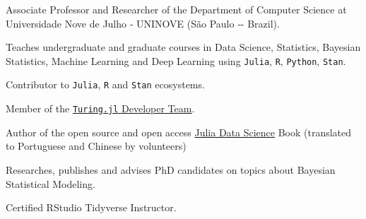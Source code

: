 \vspace{0.25cm}

\begin{cvitems}

	\item Associate Professor and Researcher of the Department of Computer Science at Universidade Nove de Julho ‑
	UNINOVE (São Paulo ‑- Brazil).
	\item Teaches undergraduate and graduate courses in Data Science, Statistics, Bayesian Statistics,
	Machine Learning and Deep Learning using \texttt{Julia}, \texttt{R}, \texttt{Python}, \texttt{Stan}.
	\item Contributor to \texttt{Julia}, \texttt{R} and \texttt{Stan} ecosystems.
	\item Member of the \href{https://turing.ml/dev/team/}{\texttt{Turing.jl} Developer Team}.
	\item Author of the open source and open access \href{https://juliadatascience.io}{Julia Data Science} Book (translated to Portuguese and Chinese by volunteers)
	\item Researches, publishes and advises PhD candidates on topics about Bayesian Statistical Modeling.
	\item Certified RStudio Tidyverse Instructor.

\end{cvitems}
